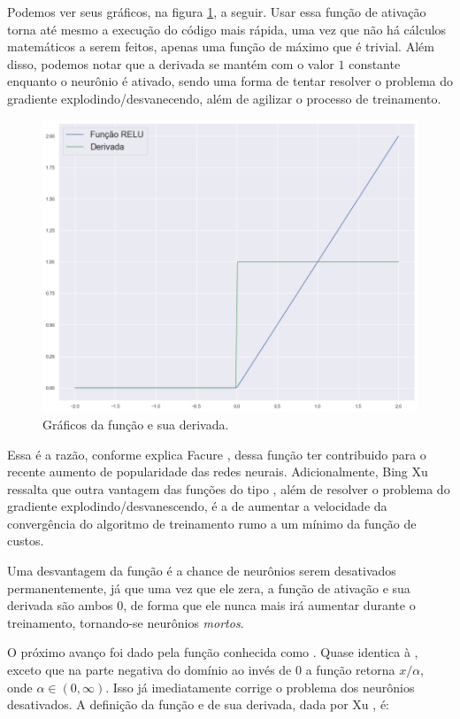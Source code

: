 Podemos ver seus gráficos, na figura \ref{fig:relu}, a seguir. Usar essa função de ativação torna até mesmo a execução do código mais rápida, uma vez que não há cálculos matemáticos a serem feitos, apenas uma função de máximo que é trivial. Além disso, podemos notar que a derivada se mantém com o valor $1$ constante enquanto o neurônio é ativado, sendo uma forma de tentar resolver o problema do gradiente explodindo/desvanecendo, além de agilizar o processo de treinamento. 

\begin{figure}[htb]
\centering
\includegraphics[width=12cm]{figuras/relu}
\caption{Gráficos da função  e sua derivada.}
\label{fig:relu}
\end{figure}

Essa é a razão, conforme explica Facure \citep{matheus}, dessa função ter contribuido para o recente aumento de popularidade das redes neurais. Adicionalmente, Bing Xu \citep{xu_relu} ressalta que outra vantagem das funções do tipo , além de resolver o problema do gradiente explodindo/desvanescendo, é a de aumentar a velocidade da convergência do algoritmo de treinamento rumo a um mínimo da função de custos.

Uma desvantagem da função  é a chance de neurônios serem desativados permanentemente, já que uma vez que ele zera, a função de ativação e sua derivada são ambos $0$, de forma que ele nunca mais irá aumentar durante o treinamento, tornando-se neurônios \emph{mortos}.

O próximo avanço foi dado pela função conhecida como . Quase identica à , exceto que na parte negativa do domínio ao invés de $0$ a função retorna $x/\alpha$, onde $\alpha \in (0, \infty)$. Isso já imediatamente corrige o problema dos neurônios desativados. A definição da função e de sua derivada, dada por Xu \citep{xu_relu}, é:

